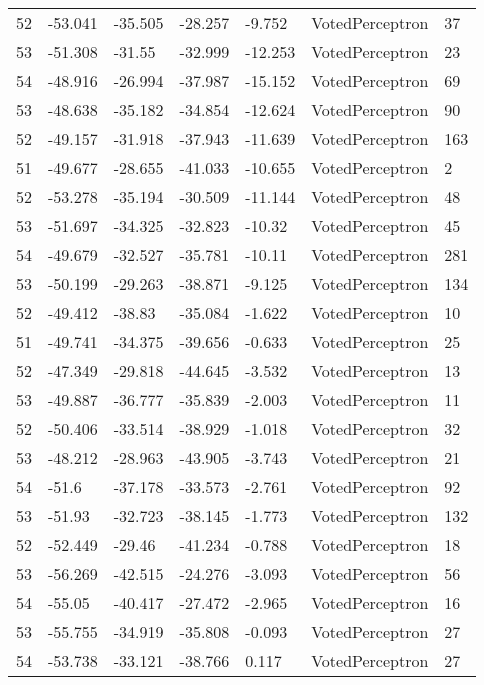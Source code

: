 \begin{tabular}{lllllll}
52 & -53.041 & -35.505 & -28.257 &  -9.752 &    VotedPerceptron &   37 \\
53 & -51.308 &  -31.55 & -32.999 & -12.253 &    VotedPerceptron &   23 \\
54 & -48.916 & -26.994 & -37.987 & -15.152 &    VotedPerceptron &   69 \\
53 & -48.638 & -35.182 & -34.854 & -12.624 &    VotedPerceptron &   90 \\
52 & -49.157 & -31.918 & -37.943 & -11.639 &    VotedPerceptron &  163 \\
51 & -49.677 & -28.655 & -41.033 & -10.655 &    VotedPerceptron &    2 \\
52 & -53.278 & -35.194 & -30.509 & -11.144 &    VotedPerceptron &   48 \\
53 & -51.697 & -34.325 & -32.823 &  -10.32 &    VotedPerceptron &   45 \\
54 & -49.679 & -32.527 & -35.781 &  -10.11 &    VotedPerceptron &  281 \\
53 & -50.199 & -29.263 & -38.871 &  -9.125 &    VotedPerceptron &  134 \\
52 & -49.412 &  -38.83 & -35.084 &  -1.622 &    VotedPerceptron &   10 \\
51 & -49.741 & -34.375 & -39.656 &  -0.633 &    VotedPerceptron &   25 \\
52 & -47.349 & -29.818 & -44.645 &  -3.532 &    VotedPerceptron &   13 \\
53 & -49.887 & -36.777 & -35.839 &  -2.003 &    VotedPerceptron &   11 \\
52 & -50.406 & -33.514 & -38.929 &  -1.018 &    VotedPerceptron &   32 \\
53 & -48.212 & -28.963 & -43.905 &  -3.743 &    VotedPerceptron &   21 \\
54 &   -51.6 & -37.178 & -33.573 &  -2.761 &    VotedPerceptron &   92 \\
53 &  -51.93 & -32.723 & -38.145 &  -1.773 &    VotedPerceptron &  132 \\
52 & -52.449 &  -29.46 & -41.234 &  -0.788 &    VotedPerceptron &   18 \\
53 & -56.269 & -42.515 & -24.276 &  -3.093 &    VotedPerceptron &   56 \\
54 &  -55.05 & -40.417 & -27.472 &  -2.965 &    VotedPerceptron &   16 \\
53 & -55.755 & -34.919 & -35.808 &  -0.093 &    VotedPerceptron &   27 \\
54 & -53.738 & -33.121 & -38.766 &   0.117 &    VotedPerceptron &   27 \\

\end{tabular}
